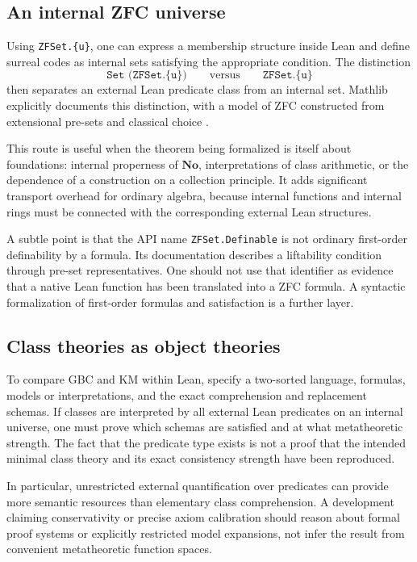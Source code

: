 \documentclass[11pt,letterpaper]{article}
\theoremstyle{definition}
\theoremstyle{remark}
\newcommand{\No}{\mathbf{No}}
\numberwithin{equation}{section}
\begin{document}
\subsection{An internal ZFC universe}
Using \texttt{ZFSet.\{u\}}, one can express a membership structure inside Lean and define surreal codes as internal sets satisfying the appropriate condition. The distinction
\[
 \texttt{Set (ZFSet.\{u\})}\qquad\text{versus}\qquad
 \texttt{ZFSet.\{u\}}
\]
then separates an external Lean predicate class from an internal set. Mathlib explicitly documents this distinction, with a model of ZFC constructed from extensional pre-sets and classical choice \cite{MathlibZF,MathlibClass}.

This route is useful when the theorem being formalized is itself about foundations: internal properness of \(\No\), interpretations of class arithmetic, or the dependence of a construction on a collection principle. It adds significant transport overhead for ordinary algebra, because internal functions and internal rings must be connected with the corresponding external Lean structures.

A subtle point is that the API name \texttt{ZFSet.Definable} is not ordinary first-order definability by a formula. Its documentation describes a liftability condition through pre-set representatives. One should not use that identifier as evidence that a native Lean function has been translated into a ZFC formula. A syntactic formalization of first-order formulas and satisfaction is a further layer.

\subsection{Class theories as object theories}
To compare GBC and KM within Lean, specify a two-sorted language, formulas, models or interpretations, and the exact comprehension and replacement schemas. If classes are interpreted by all external Lean predicates on an internal universe, one must prove which schemas are satisfied and at what metatheoretic strength. The fact that the predicate type exists is not a proof that the intended minimal class theory and its exact consistency strength have been reproduced.

In particular, unrestricted external quantification over predicates can provide more semantic resources than elementary class comprehension. A development claiming conservativity or precise axiom calibration should reason about formal proof systems or explicitly restricted model expansions, not infer the result from convenient metatheoretic function spaces.
\end{document}
